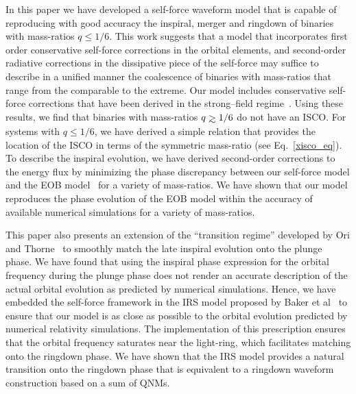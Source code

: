 \documentclass[aps,prd,showpacs,amssymb,floatfix,nofootinbib,superscriptaddress]{revtex4-1}%
\def\gtrsim{\mathrel{\hbox{\rlap{\hbox{\lower4pt\hbox{$\sim$}}}\hbox{$>$}}}}
\begin{document}
In this paper we have developed a self-force waveform model that is capable of reproducing with good accuracy the inspiral, merger and ringdown of binaries with mass-ratios \(q\leq 1/6\). This work suggests that a model that incorporates first order conservative self-force corrections in the orbital elements, and second-order radiative corrections in the dissipative piece of the self-force may suffice to describe in a unified manner the coalescence of binaries with mass-ratios that range from the comparable to the extreme. Our model includes conservative self-force corrections that have been derived in the strong--field regime~\cite{Akcay:2012}. Using these results, we find that binaries with mass-ratios \(q\gtrsim1/6\) do not have an ISCO. For systems with \(q\leq1/6\), we have derived a simple relation that provides the location of the ISCO in terms of the symmetric mass-ratio (see Eq.~\eqref{xisco_eq}). To describe the inspiral evolution, we have derived second-order corrections to the energy flux by minimizing the phase discrepancy between our self-force model and the EOB model~\cite{buho, Damour:2013} for a variety of mass-ratios. We have shown that our model reproduces the phase evolution of the EOB model within the accuracy of available numerical simulations for a variety of mass-ratios. 

This paper also presents an extension of the ``transition regime'' developed by Ori and Thorne~\cite{amos} to smoothly match the late inspiral evolution onto the plunge phase. We have found that using the inspiral phase expression for the orbital frequency during the plunge phase does not render an accurate description of the actual orbital evolution as predicted by numerical simulations. Hence, we have embedded the self-force framework in the IRS model proposed by Baker et al~\cite{Baker:2008} to ensure that our model is as close as possible to the orbital evolution predicted by numerical relativity simulations. The implementation of this  prescription ensures that the orbital frequency saturates near the light-ring, which facilitates matching onto the ringdown phase. We have shown that the IRS model provides a natural transition onto the ringdown phase that is equivalent to a ringdown waveform construction based on a sum of QNMs. 
\end{document}
